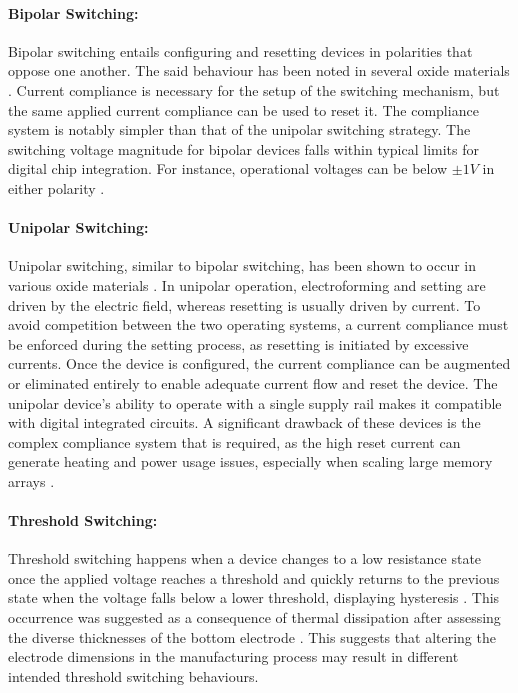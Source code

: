 \paragraph{Bipolar Switching:} Bipolar switching entails configuring and resetting devices in polarities that oppose one another. The said behaviour has been noted in several oxide materials \cite{wei2008highly}. Current compliance is necessary for the setup of the switching mechanism, but the same applied current compliance can be used to reset it. The compliance system is notably simpler than that of the unipolar switching strategy. The switching voltage magnitude for bipolar devices falls within typical limits for digital chip integration. For instance, operational voltages can be below $\pm 1V$ in either polarity \cite{menke2009separation}. 

\paragraph{Unipolar Switching:} Unipolar switching, similar to bipolar switching, has been shown to occur in various oxide materials \cite{jeong2007coexistence}. In unipolar operation, electroforming and setting are driven by the electric field, whereas resetting is usually driven by current. To avoid competition between the two operating systems, a current compliance must be enforced during the setting process, as resetting is initiated by excessive currents. Once the device is configured, the current compliance can be augmented or eliminated entirely to enable adequate current flow and reset the device. The unipolar device's ability to operate with a single supply rail makes it compatible with digital integrated circuits. A significant drawback of these devices is the complex compliance system that is required, as the high reset current can generate heating and power usage issues, especially when scaling large memory arrays \cite{yun2007random}.

\paragraph{Threshold Switching:} Threshold switching happens when a device changes to a low resistance state once the applied voltage reaches a threshold and quickly returns to the previous state when the voltage falls below a lower threshold, displaying hysteresis \cite{adler1980threshold}. This occurrence was suggested as a consequence of thermal dissipation after assessing the diverse thicknesses of the bottom electrode \cite{chang2008effects}. This suggests that altering the electrode dimensions in the manufacturing process may result in different intended threshold switching behaviours. \\

